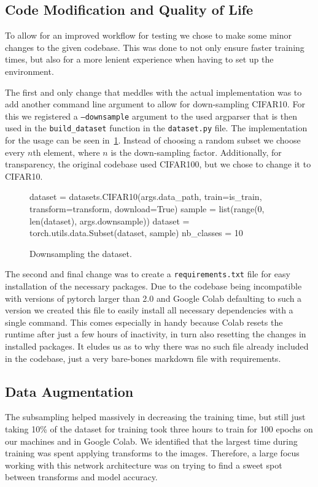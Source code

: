 \documentclass{article}
\begin{document}
\subsection{Code Modification and Quality of Life}\label{subsec:code-modification}
To allow for an improved workflow for testing we chose to make some minor changes to the given codebase.
This was done to not only ensure faster training times, but also for a more lenient experience when having to set up the environment.

The first and only change that meddles with the actual implementation was to add another command line argument to allow for down-sampling CIFAR10.
For this we registered a \texttt{--downsample} argument to the used argparser that is then used in the \verb|build_dataset| function in the \texttt{dataset.py} file.
The implementation for the usage can be seen in~\ref{fig:downsampling}.
Instead of choosing a random subset we choose every $n$th element, where $n$ is the down-sampling factor.
Additionally, for transparency, the original codebase used CIFAR100, but we chose to change it to CIFAR10.
\begin{figure}[h]
    \begin{python}
        dataset = datasets.CIFAR10(args.data_path, train=is_train,
        transform=transform, download=True)
        sample = list(range(0, len(dataset), args.downsample))
        dataset = torch.utils.data.Subset(dataset, sample)
        nb_classes = 10
    \end{python}
    \caption{Downsampling the dataset.}
    \label{fig:downsampling}
\end{figure}

The second and final change was to create a \texttt{requirements.txt} file for easy installation of the necessary packages.
Due to the codebase being incompatible with versions of pytorch larger than 2.0 and Google Colab defaulting to such a version we created this file to easily install all necessary dependencies with a single command.
This comes especially in handy because Colab resets the runtime after just a few hours of inactivity, in turn also resetting the changes in installed packages.
It eludes us as to why there was no such file already included in the codebase, just a very bare-bones markdown file with requirements.

\subsection{Data Augmentation}\label{subsec:data-augmentation}
The subsampling helped massively in decreasing the training time, but still just taking 10\% of the dataset for training took three hours to train for 100 epochs on our machines and in Google Colab.
We identified that the largest time during training was spent applying transforms to the images.
Therefore, a large focus working with this network architecture was on trying to find a sweet spot between transforms and model accuracy.
\end{document}
